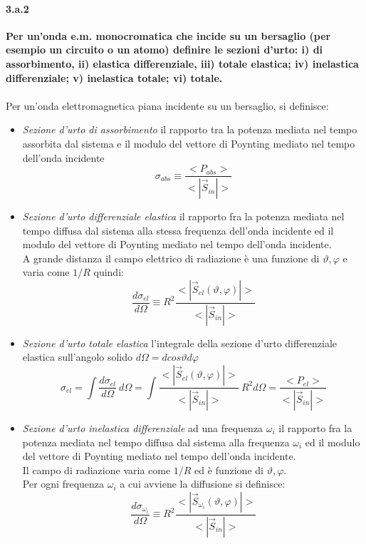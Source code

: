 \documentclass[twoside]{article}
\begin{document}
\paragraph{3.a.2}\textbf{Per un’onda e.m. monocromatica che incide su un bersaglio (per esempio un
circuito o un atomo) definire le sezioni d’urto: i) di assorbimento, ii) elastica
differenziale, iii) totale elastica; iv) inelastica differenziale; v) inelastica totale;
vi) totale.}\\ \\
Per un'onda elettromagnetica piana incidente su un bersaglio, si definisce:
\begin{itemize}
    \item \textit{Sezione d'urto di assorbimento} il rapporto tra la potenza mediata nel tempo assorbita dal sistema e il modulo del vettore di Poynting mediato nel tempo dell'onda incidente
    \begin{equation}
        \sigma_{abs}\equiv \frac{<P_{abs}>}{<|\vec{S}_{in}|>}
    \end{equation}
    
    \item \textit{Sezione d'urto differenziale elastica} il rapporto fra la potenza mediata nel tempo
diffusa dal sistema alla stessa frequenza dell'onda incidente ed il modulo
del vettore di Poynting mediato nel tempo dell'onda incidente.
\\
A grande distanza il campo elettrico di radiazione è una funzione di $\vartheta, \varphi$ e varia come $1/R$ quindi:
\begin{equation}
    \frac{d\sigma_{el}}{d\Omega}\equiv R^2\frac{<|\vec{S}_{el}(\vartheta,\varphi)|>}{<|\vec{S}_{in}|>}
\end{equation}
    
    \item \textit{Sezione d'urto totale elastica} l'integrale della sezione d'urto differenziale elastica sull'angolo solido $d\Omega=dcos\vartheta d\varphi$
    \begin{equation}
        \sigma_{el}=\int \frac{d\sigma_{el}}{d\Omega}\ d\Omega=\int \frac{<|\vec{S}_{el}(\vartheta,\varphi)|>}{<|\vec{S}_{in}|>}\ R^2d\Omega=\frac{<P_{el}>}{<|\vec{S}_{in}|>}
    \end{equation}
    
    \item \textit{Sezione d'urto inelastica differenziale} ad una frequenza $\omega_i$ il rapporto fra la potenza mediata nel tempo
    diffusa dal sistema alla frequenza $\omega_i$ ed il modulo del vettore di Poynting
    mediato nel tempo dell'onda incidente.
    \\
    Il campo di radiazione varia come $1/R$ ed è funzione di $\vartheta, \varphi$.
    \\
    Per ogni frequenza $\omega_i$ a cui avviene la diffusione si definisce:
    \begin{equation}
        \frac{d\sigma_{\omega_i}}{d\Omega}\equiv R^2\frac{<|\vec{S}_{\omega_i} (\vartheta, \varphi)|>}{<|\vec{S}_{in}|>}
    \end{equation}
    

\end{itemize}
\end{document}
